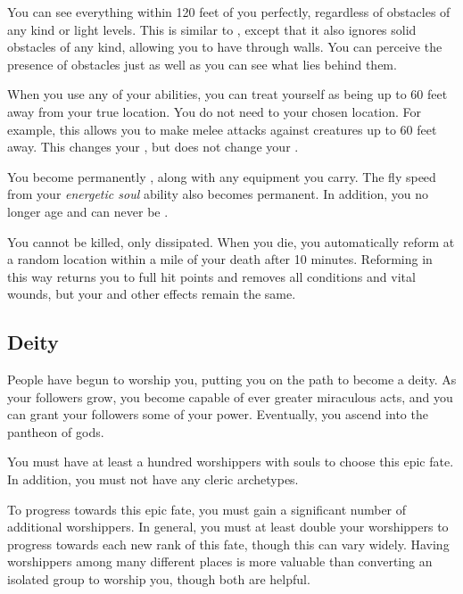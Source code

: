        You can see everything within 120 feet of you perfectly, regardless of obstacles of any kind or light levels.
      This is similar to , except that it also ignores solid obstacles of any kind, allowing you to have  through walls.
      You can perceive the presence of obstacles just as well as you can see what lies behind them.

       When you use any of your abilities, you can treat yourself as being up to 60 feet away from your true location.
      You do not need  to your chosen location.
      For example, this allows you to make melee attacks against creatures up to 60 feet away.
      This changes your , but does not change your .

       You become permanently , along with any equipment you carry.
      The fly speed from your \textit{energetic soul} ability also becomes permanent.
      In addition, you no longer age and can never be .

       You cannot be killed, only dissipated.
      When you die, you automatically reform at a random location within a mile of your death after 10 minutes.
      Reforming in this way returns you to full hit points and removes all conditions and vital wounds, but your  and other effects remain the same.

  \subsection{Deity}
    People have begun to worship you, putting you on the path to become a deity.
    As your followers grow, you become capable of ever greater miraculous acts, and you can grant your followers some of your power.
    Eventually, you ascend into the pantheon of gods.

     You must have at least a hundred worshippers with souls to choose this epic fate.
    In addition, you must not have any cleric archetypes.

     To progress towards this epic fate, you must gain a significant number of additional worshippers.
    In general, you must at least double your worshippers to progress towards each new rank of this fate, though this can vary widely.
    Having worshippers among many different places is more valuable than converting an isolated group to worship you, though both are helpful.

